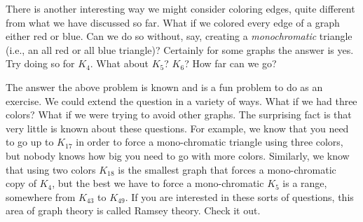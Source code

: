 \documentclass[12pt]{article}
\begin{document}
There is another interesting way we might consider coloring edges, quite different from what we have discussed so far.  What if we colored every edge of a graph either red or blue.  Can we do so without, say, creating a \emph{monochromatic} triangle (i.e., an all red or all blue triangle)?  Certainly for some graphs the answer is yes. Try doing so for $K_4$.  What about $K_5$?  $K_6$?  How far can we go?  

The answer the above problem is known and is a fun problem to do as an exercise.  We could extend the question in a variety of ways.  What if we had three colors?  What if we were trying to avoid other graphs.  The surprising fact is that very little is known about these questions.  For example, we know that you need to go up to $K_{17}$ in order to force a mono-chromatic triangle using three colors, but nobody knows how big you need to go with more colors.  Similarly, we know that using two colors $K_{18}$ is the smallest graph that forces a mono-chromatic copy of $K_4$, but the best we have to force a mono-chromatic $K_{5}$ is a range, somewhere from $K_{43}$ to $K_{49}$.  If you are interested in these sorts of questions, this area of graph theory is called Ramsey theory.  Check it out.
\end{document}
